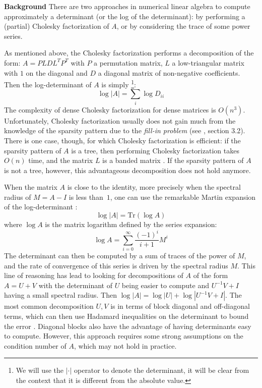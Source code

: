 \textbf{Background} There are two approaches in numerical linear algebra
to compute approximately a determinant (or the log of the determinant):
by performing a (partial) Cholesky factorization of $A$, or by considering
the trace of some power series.

As mentioned above, the Cholesky factorization performs a decomposition
of the form: $A=PLDL^{T}P^{T}$ with $P$ a permutation matrix, $L$
a low-triangular matrix with $1$ on the diagonal and $D$ a diagonal
matrix of non-negative coefficients. Then the log-determinant of $A$
is simply%
\footnote{We will use the $\left|\cdot\right|$ operator to denote the determinant,
it will be clear from the context that it is different from the absolute
value.%
}: 
\[
\log\left|A\right|=\sum_{i}\log D_{ii}
\]
The complexity of dense Cholesky factorization for dense matrices
is $O\left(n^{3}\right)$. Unfortunately, Cholesky factorization usually
does not gain much from the knowledge of the sparsity pattern due
to the \emph{fill-in problem} (see \cite{meurant1999computer}, section
3.2). There is one case, though, for which Cholesky factorization
is efficient: if the sparsity pattern of $A$ is a tree, then performing
Cholesky factorization takes $O\left(n\right)$ time, and the matrix
$L$ is a banded matrix \cite{liu1990eliminationtrees}. If the sparsity
pattern of $A$ is not a tree, however, this advantageous decomposition
does not hold anymore.

When the matrix $A$ is close to the identity, more precisely when
the spectral radius of $M=A-I$ is less than~$1$, one can use the
remarkable Martin expansion of the log-determinant \cite{martin1992approximations}:
\begin{equation}
\log\left|A\right|=\text{Tr}\left(\log A\right)\label{eq:martin-expansion}
\end{equation}
where $\log A$ is the matrix logarithm defined by the series expansion:
\begin{equation}
\log A=\sum_{i=0}^{\infty}\frac{\left(-1\right)^{i}}{i+1}M^{i}\label{eq:matrix-log}
\end{equation}
The determinant can then be computed by a sum of traces of the power
of $M$, and the rate of convergence of this series is driven by the
spectral radius $M$. This line of reasoning has lead to looking for
decompositions of $A$ of the form $A=U+V$ with the determinant of
$U$ being easier to compute and $U^{-1}V+I$ having a small spectral
radius. Then $\log\left|A\right|=\log\left|U\right|+\log\left|U^{-1}V+I\right|$.
The most common decomposition $U,V$ is in terms of block diagonal
and off-diagonal terms, which can then use Hadamard inequalities on
the determinant to bound the error \cite{Ipsen2006}. Diagonal blocks
also have the advantage of having determinants easy to compute. However,
this approach requires some strong assumptions on the condition number
of $A$, which may not hold in practice.

